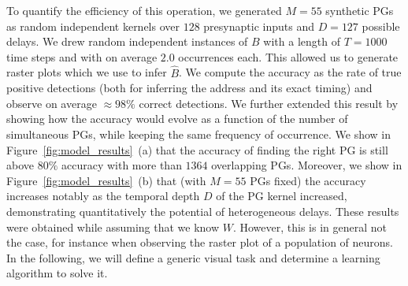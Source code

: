 \documentclass[default]{sn-jnl}%
\theoremstyle{thmstyleone}%
\theoremstyle{thmstyletwo}%
\theoremstyle{thmstylethree}%
\begin{document}
To quantify the efficiency of this operation, we generated $M=55$ synthetic PGs as random independent kernels over $128$ presynaptic inputs and $D=127$ possible delays. We drew random independent instances of $B$ with a length of $T=1000$ time steps and with on average $2.0$ occurrences each. This allowed us to generate raster plots which we use to infer $\hat{B}$. We compute the accuracy as the rate of true positive detections (both for inferring the address and its exact timing) and observe on average $\approx 98\%$ correct detections. We further extended this result by showing how the accuracy would evolve as a function of the number of simultaneous PGs, while keeping the same frequency of occurrence. We show in Figure~\ref{fig:model_results}~(a) that the accuracy of finding the right PG is still above $80\%$ accuracy with more than $1364$ overlapping PGs. Moreover, we show in Figure~\ref{fig:model_results}~(b) that (with $M=55$ PGs fixed) the accuracy increases notably as the temporal depth $D$ of the PG kernel increased, demonstrating quantitatively the potential of heterogeneous delays. These results were obtained while assuming that we know $W$. However, this is in general not the case, for instance when observing the raster plot of a population of neurons. In the following, we will define a generic visual task and determine a learning algorithm to solve it. %
    
\end{document}
